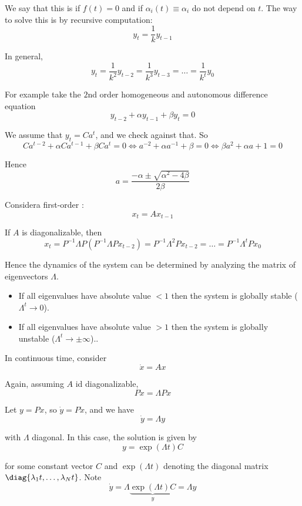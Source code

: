 \documentclass{article}
\begin{document}
We say that this is  if $f(t) = 0$ and  if $\alpha_i(t) \equiv \alpha_i$ do not depend on $t$. The way to solve this is by recursive computation:
\[
  y_t = \dfrac{1}{k} y_{t - 1}
\]

In general,
\[
  y_t
  = \dfrac{1}{k^2} y_{t - 2}
  = \dfrac{1}{k^3} y_{t - 3}
  = \ldots
  = \dfrac{1}{k^t} y_{0}
\]

For example take the $2$nd order homogeneous and autonomous difference equation
\[
  y_{t - 2} + \alpha y_{t - 1} + \beta y_{t} = 0
\]

We assume that $y_t = Ca^t$, and we check against that. So
\[
  Ca^{t - 2}
  + \alpha Ca^{t - 1}
  + \beta Ca^{t}
  = 0
  \iff
  a^{-2}
  + \alpha a^{-1}
  + \beta
  = 0
  \iff
  \beta a^2 + \alpha a + 1 = 0
\]

Hence
\[
  a = \dfrac{-\alpha \pm \sqrt{\alpha^2 - 4\beta}}{2\beta}
\]

Considera first-order : 
\[
  x_t = A x_{t - 1}
\]

If $A$ is diagonalizable, then
\[
  x_t
  = P^{-1} \Lambda P \left(P^{-1} \Lambda P x_{t - 2}\right)
  = P^{-1} \Lambda^2 P x_{t - 2}
  = \ldots
  = P^{-1} \Lambda^t P x_{0}
\]

Hence the dynamics of the system can be determined by analyzing the matrix of eigenvectors $\Lambda$.
\begin{itemize}[label=$\bullet$]
  \item If all eigenvalues have absolute value $< 1$ then the system is globally stable ($\Lambda^t \to 0$).

  \item If all eigenvalues have absolute value $> 1$ then the system is globally unstable ($\Lambda^t \to \pm \infty$)..
\end{itemize}

In continuous time, consider
\[
  \dot{x} = A x
\]

Again, assuming $A$ id diagonalizable,
\[
  P \dot{x} = \Lambda P x
\]

Let $y = P x$, so $\dot{y} = P \dot{x}$, and we have
\[
  \dot{y} = \Lambda y
\]

with $\Lambda$ diagonal. In this case, the solution is given by
\[
  y = \exp(\Lambda t) C
\]

for some constant vector $C$ and $\exp(\Lambda t)$ denoting the diagonal matrix $\diag{\lambda_1 t, \ldots, \lambda_N t}$. Note
\[
  \dot{y}
  =
  \Lambda
  \underbrace{\exp(\Lambda t) C}_y
  =
  \Lambda y
\]
\end{document}
